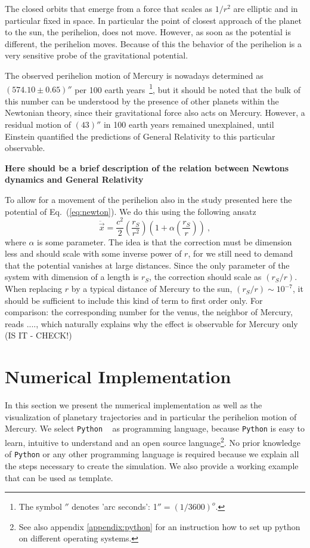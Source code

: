 \documentclass[12pt]{iopart}
\newcommand{\python}[0]{\texttt{Python} }
\begin{document}
The closed orbits that emerge from a force that scales as $1/r^2$
are elliptic and in particular fixed in space. In particular the point of closest approach of the planet
to the sun, the perihelion, does not move.
  However, as soon
as the potential is different, the perihelion moves. Because of this the behavior of the perihelion
is a very sensitive probe of the gravitational potential. 

The observed perihelion motion of Mercury is nowadays determined as $(574.10\pm 0.65)''$ per
100 earth years~\footnote{The symbol $''$ denotes 'arc seconds': 1$''=(1/3600)^o$. }, but it should be noted that the bulk of this number
can be understood by the presence of other planets within the Newtonian theory, since
their gravitational force also acts on Mercury. However, a
residual motion of $(43)''$ in 100 earth years remained unexplained, until Einstein quantified the
predictions of General Relativity to this particular observable. 


{\bf Here should be a brief description of the relation between Newtons dynamics and General Relativity}

To allow for a movement of the perihelion also in the study presented here the
potential of Eq.~(\ref{eq:newton}). We do this using the following ansatz
\begin{equation}
\ddot{\vec x} = \frac{c^2}{2}\left(\frac{r_S}{r^2}\right)\left(1+\alpha\left(\frac{r_S}{r}\right)\right) \ ,
\label{eq:newton_art}
\end{equation}
where $\alpha$ is some parameter. The idea is that the correction must be dimension less and
should scale with some inverse power of $r$, for we still need to demand that the potential 
vanishes at large distances. Since the only parameter of the system with dimension
of a length is $r_S$, the correction should scale as $(r_S/r)$. When replacing $r$ by a typical
distance of Mercury to the sun, $(r_S/r)\sim 10^{-7}$, it should be sufficient to include this kind
of term to first order only. For comparison: the corresponding number for the venus, the neighbor
of  Mercury, reads ...., which naturally explains why the effect is observable for Mercury only (IS IT - CHECK!)


\section{Numerical Implementation}
\label{sec:Numerical Implementation}
In this section we present the numerical implementation as well as the visualization of planetary trajectories and in
particular
  the perihelion motion of Mercury.  We select \python~\cite{} as  programming language, because \python is easy to learn, 
  intuitive to understand and an open source language\footnote{See also appendix \ref{appendix:python} for an instruction 
  how to set up python on different operating systems.}.  No prior knowledge of \python or any other programming language 
  is required because we explain all the steps necessary to create the simulation.  We also provide a working 
  example \cite{} that can be used as template.
\end{document}
